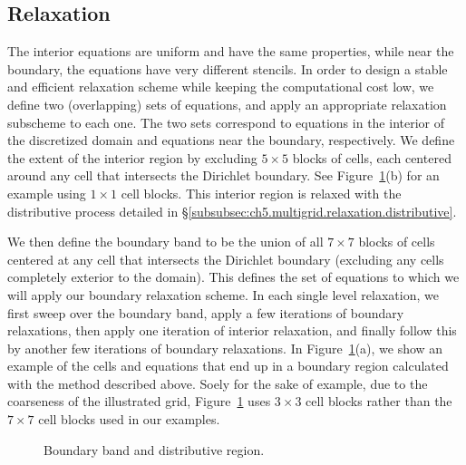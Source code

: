 \subsection{Relaxation}

The interior equations are uniform and have the same properties, while near the boundary, the equations have very different stencils. In order to design a stable and efficient relaxation scheme while keeping the computational cost low, we define two (overlapping) sets of equations, and apply an appropriate relaxation subscheme to each one. The two sets correspond to equations in the interior of the discretized domain and equations near the boundary, respectively. We define the extent of the interior region by excluding $5 \times 5$ blocks of cells, each centered around any cell that intersects the Dirichlet boundary. See Figure~\ref{fig:ch5.boundaryband}(b) for an example using $1 \times 1$ cell blocks. This interior region is relaxed with the distributive process detailed in \S\ref{subsubsec:ch5.multigrid.relaxation.distributive}.

We then define the boundary band to be the union of all $7 \times 7$ blocks of cells centered at any cell that intersects the Dirichlet boundary (excluding any cells completely exterior to the domain). This defines the set of equations to which we will apply our boundary relaxation scheme. In each single level relaxation, we first sweep over the boundary band, apply a few iterations of boundary relaxations, then apply one iteration of interior relaxation, and finally follow this by another few iterations of boundary relaxations. In Figure~\ref{fig:ch5.boundaryband}(a), we show an example of the cells and equations that end up in a boundary region calculated with the method described above. Soely for the sake of example, due to the coarseness of the illustrated grid, Figure~\ref{fig:ch5.boundaryband} uses $3 \times 3$ cell blocks rather than the $7 \times 7$ cell blocks used in our examples.

\setlength{\figureheight}{0.40\columnwidth}
\begin{figure}[htbp]
\begin{center}
\caption{Boundary band and distributive region.}
\label{fig:ch5.boundaryband}
\end{center}
\end{figure}

